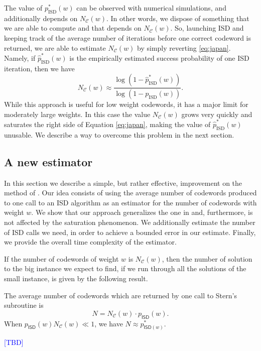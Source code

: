 The value of $p_{\text{ISD}}^*(w)$ can be observed with numerical simulations, and additionally depends on $N_{\mathscr C}(w)$.
In other words, we dispose of something that we are able to compute and that depends on $N_{\mathscr C}(w)$.
So, launching ISD and keeping track of the average number of iterations before one correct codeword is returned, we are able to estimate $N_{\mathscr C}(w)$ by simply reverting \eqref{eq:japan}.
Namely, if $\widehat{p}_{\text{ISD}}^*(w)$ is the empirically estimated success probability of one ISD iteration, then we have
\begin{equation}
\label{eq:obtain_md}
N_{\mathscr C}(w) \approx \frac{\log\left(1-\widehat{p}_{\text{ISD}}^*(w)\right)}{\log\left(1-p_{\text{ISD}}(w)\right)}.
\end{equation}
While this approach is useful for low weight codewords, it has a major limit for moderately large weights. In this case the value $N_{\mathscr{C}}(w)$ grows very quickly and saturates the right side of Equation \ref{eq:japan}, making the value of $\widehat{p}_{\text{ISD}}^*(w)$ unusable.
We describe a way to overcome this problem in the next section.

\subsection{A new estimator}

In this section we describe a simple, but rather effective, improvement on the method of \cite{hirotomo}.
Our idea consists of using the average number of codewords produced to one call to an ISD algorithm as an estimator for the number of codewords with weight $w$.
We show that our approach generalizes the one in \cite{hirotomo} and, furthermore, is not affected by the saturation phenomenon.
We additionally estimate the number of ISD calls we need, in order to achieve a bounded error in our estimate.
Finally, we provide the overall time complexity of the estimator.


If the number of codewords of weight $w$ is $N_{\mathscr{C}}(w)$, then the number of solution to the big instance we expect to find, if we run through all the solutions of the small instance, is given by the following result.
\begin{proposition}
The average number of codewords which are returned by one call to Stern's subroutine is $$N = N_{\mathscr C}(w) \cdot p_{\mathsf{ISD}}(w).$$
When $p_{\mathsf{ISD}}(w)N_{\mathscr C}(w)\ll 1$, we have $N\approx p^*_{\mathsf{ISD}(w)}$.
\end{proposition}
\begin{IEEEproof}
\textcolor{blue}{[TBD]}
\end{IEEEproof}

